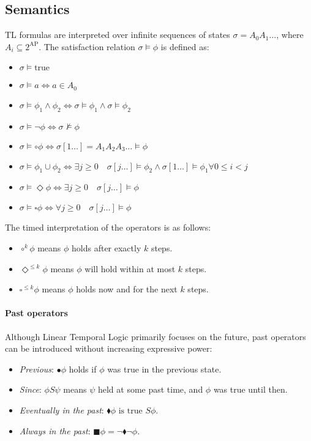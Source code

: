 \subsection{Semantics}
TL formulas are interpreted over infinite sequences of states $\sigma=A_0A_1\dots$, where $A_i \subseteq 2^{\text{AP}}$.
The satisfaction relation $\sigma\models\phi$ is defined as:
\begin{itemize}
    \item $\sigma\models\text{true}$
    \item $\sigma\models a \Leftrightarrow a\in A_0$
    \item $\sigma\models \phi_1\land\phi_2 \Leftrightarrow \sigma\models\phi_1 \land \sigma\models\phi_2$
    \item $\sigma\models \lnot\phi \Leftrightarrow \sigma\not\models\phi$
    \item $\sigma\models \circ \phi \Leftrightarrow \sigma[1\dots]=A_1A_2A_3\dots\models\phi$
    \item $\sigma\models \phi_1\cup\phi_2 \Leftrightarrow \exists j \geq 0\quad\sigma[j\dots]\models\phi_2 \land \sigma[1\dots]\models\phi_1\forall 0\leq i<j$
    \item $\sigma\models\Diamond\phi \Leftrightarrow \exists j\geq 0 \quad \sigma[j\dots]\models\phi$
    \item $\sigma\models\square\phi \Leftrightarrow \forall j\geq 0 \quad \sigma[j\dots]\models\phi$
\end{itemize}
\noindent The timed interpretation of the operators is as follows: 
\begin{itemize}
    \item $\circ^k\phi$ means $\phi$ holds after exactly $k$ steps. 
    \item $\Diamond^{\leq k}\phi$ means $\phi$ will hold within at most $k$ steps. 
    \item $\square^{\leq k}\phi$ means $\phi$ holds now and for the next $k$ steps.
\end{itemize}

\paragraph*{Past operators}
Although Linear Temporal Logic primarily focuses on the future, past operators can be introduced without increasing expressive power:
\begin{itemize}
    \item \textit{Previous}: $\bullet\phi$ holds if $\phi$ was true in the previous state.
    \item \textit{Since}: $\phi S \psi$ means $\psi$ held at some past time, and $\phi$ was true until then.
    \item \textit{Eventually in the past}: $\blacklozenge \phi\text{ is true }S\phi$.
    \item \textit{Always in the past}: $\blacksquare \phi=\lnot\blacklozenge \lnot\phi$.
\end{itemize}

